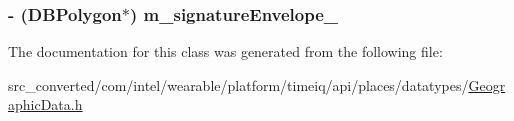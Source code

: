 \subsubsection[{m\+\_\+signature\+Envelope\+\_\+}]{\setlength{\rightskip}{0pt plus 5cm}-\/ (D\+B\+Polygon$\ast$) m\+\_\+signature\+Envelope\+\_\+}\label{interface_geographic_data_a521c4372fd8157258cb4f54327bcbcd9}


The documentation for this class was generated from the following file\+:\begin{DoxyCompactItemize}
\item 
src\+\_\+converted/com/intel/wearable/platform/timeiq/api/places/datatypes/\hyperlink{_geographic_data_8h}{Geographic\+Data.\+h}\end{DoxyCompactItemize}
